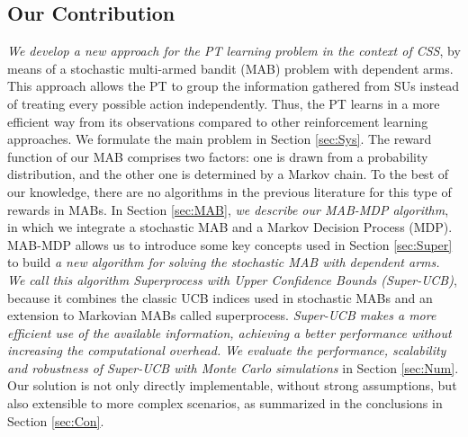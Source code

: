 \subsection{Our Contribution}

\textit{We develop a new approach for the PT learning problem in the context of CSS}, by means of a stochastic multi-armed bandit (MAB) problem with dependent arms. This approach allows the PT to group the information gathered from SUs instead of treating every possible action independently. Thus, the PT learns in a more efficient way from its observations compared to other reinforcement learning approaches. We formulate the main problem in Section \ref{sec:Sys}.
The reward function of our MAB comprises two factors: one is drawn from a probability distribution, and the other one is determined by a Markov chain.
To the best of our knowledge, there are no algorithms in the previous literature for this type of rewards in MABs. 
In Section \ref{sec:MAB}, \textit{we describe our MAB-MDP algorithm}, in which we integrate a stochastic MAB and a Markov Decision Process (MDP). MAB-MDP allows us to introduce some key concepts used in Section \ref{sec:Super} to build \textit{a new algorithm for solving the stochastic MAB with dependent arms. We call this algorithm Superprocess with Upper Confidence Bounds (Super-UCB)}, because it combines the classic UCB indices used in stochastic MABs and an extension to Markovian MABs \cite{ref:Auer2002} called superprocess. \textit{Super-UCB makes a more efficient use of the available information, achieving a better performance without increasing the computational overhead.} \textit{We evaluate the performance, scalability and robustness of Super-UCB with Monte Carlo simulations} in Section \ref{sec:Num}.
Our solution is not only directly implementable, without strong assumptions, but also extensible to more complex scenarios, as summarized in the conclusions in Section \ref{sec:Con}.


